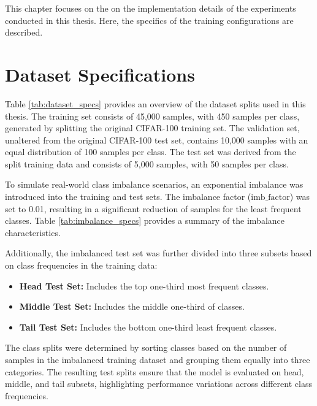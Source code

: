
This chapter focuses on the on the implementation details of the experiments conducted in this thesis. Here, the specifics of the training configurations are described. 

\section{Dataset Specifications}
Table \ref{tab:dataset_specs} provides an overview of the dataset splits used in this thesis. The training set consists of 45,000 samples, with 450 samples per class, generated by splitting the original CIFAR-100 training set. The validation set, unaltered from the original CIFAR-100 test set, contains 10,000 samples with an equal distribution of 100 samples per class. The test set was derived from the split training data and consists of 5,000 samples, with 50 samples per class.

To simulate real-world class imbalance scenarios, an exponential imbalance was introduced into the training and test sets. The imbalance factor (\(\text{imb\_factor}\)) was set to 0.01, resulting in a significant reduction of samples for the least frequent classes. Table \ref{tab:imbalance_specs} provides a summary of the imbalance characteristics.

Additionally, the imbalanced test set was further divided into three subsets based on class frequencies in the training data:

\begin{itemize}
    \item \textbf{Head Test Set:} Includes the top one-third most frequent classes.
    \item \textbf{Middle Test Set:} Includes the middle one-third of classes.
    \item \textbf{Tail Test Set:} Includes the bottom one-third least frequent classes.
\end{itemize}

The class splits were determined by sorting classes based on the number of samples in the imbalanced training dataset and grouping them equally into three categories. The resulting test splits ensure that the model is evaluated on head, middle, and tail subsets, highlighting performance variations across different class frequencies.



